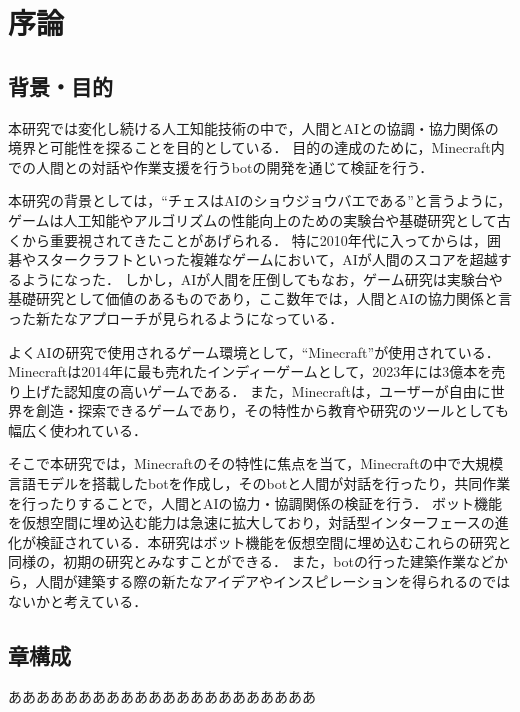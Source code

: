 \chapter{序論}	
\thispagestyle{plain}   %

\section{背景・目的}
本研究では変化し続ける人工知能技術の中で，人間とAIとの協調・協力関係の境界と可能性を探ることを目的としている．
目的の達成のために，Minecraft内での人間との対話や作業支援を行うbotの開発を通じて検証を行う．

本研究の背景としては，``チェスはAIのショウジョウバエである''\cite{bib:chess}と言うように，ゲームは人工知能やアルゴリズムの性能向上のための実験台や基礎研究として古くから重要視されてきたことがあげられる．
特に2010年代に入ってからは，囲碁やスタークラフトといった複雑なゲームにおいて，AIが人間のスコアを超越するようになった\cite{bib:AplpaGo,bibAlphaStar}．
しかし，AIが人間を圧倒してもなお，ゲーム研究は実験台や基礎研究として価値のあるものであり，ここ数年では，人間とAIの協力関係と言った新たなアプローチが見られるようになっている\cite{bib:maia,bib:CraftAssist}．

よくAIの研究で使用されるゲーム環境として，``Minecraft''\cite{bib:Minecraft}が使用されている．
Minecraftは2014年に最も売れたインディーゲームとして，2023年には3億本を売り上げた認知度の高いゲームである\cite{bib:minecraft_news}．
また，Minecraftは，ユーザーが自由に世界を創造・探索できるゲームであり，その特性から教育や研究のツールとしても幅広く使われている．

そこで本研究では，Minecraftのその特性に焦点を当て，Minecraftの中で大規模言語モデルを搭載したbotを作成し，そのbotと人間が対話を行ったり，共同作業を行ったりすることで，人間とAIの協力・協調関係の検証を行う．
ボット機能を仮想空間に埋め込む能力は急速に拡大しており，対話型インターフェースの進化が検証されている．本研究はボット機能を仮想空間に埋め込むこれらの研究と同様の，初期の研究とみなすことができる．
また，botの行った建築作業などから，人間が建築する際の新たなアイデアやインスピレーションを得られるのではないかと考えている．

\section{章構成}
ああああああああああああああああああああああ